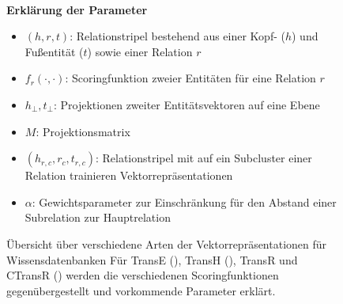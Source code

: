\begin{figure}[h]
  \centering
  \bgroup
  \def\arraystretch{1.5}
  \egroup
   \\\vspace{0.5cm}

\textbf{Erklärung der Parameter}

\begin{multicols}{2}

  \begin{itemize}
    \item $(h, r, t)$: Relationstripel bestehend aus einer Kopf- ($h$) und Fußentität ($t$) sowie einer Relation $r$
    \item $f_r(\cdot, \cdot)$: Scoringfunktion zweier Entitäten für eine Relation $r$
    \item $h_{\bot}, t_{\bot}$: Projektionen zweiter Entitätsvektoren auf eine Ebene
  \end{itemize}

  \columnbreak

  \begin{itemize}
    \item $M$: Projektionsmatrix
    \item $(h_{r, c}, r_c, t_{r, c})$: Relationstripel mit auf ein Subcluster einer Relation trainieren Vektorrepräsentationen
    \item $\alpha$: Gewichtsparameter zur Einschränkung für den Abstand einer Subrelation zur Hauptrelation
  \end{itemize}

  \end{multicols}
  \caption[Übersicht über verschiedene Arten der Vektorrepräsentationen für Wissensdatenbanken]{Übersicht über verschiedene Arten der Vektorrepräsentationen für Wissensdatenbanken
  Für TransE (\cite{bordes2013translating}), TransH (\cite{wang2014knowledge}), TransR und CTransR (\cite{lin2015learning})
  werden die verschiedenen Scoringfunktionen gegenübergestellt und vorkommende Parameter erklärt. \label{fig:scoring}}
\end{figure}

